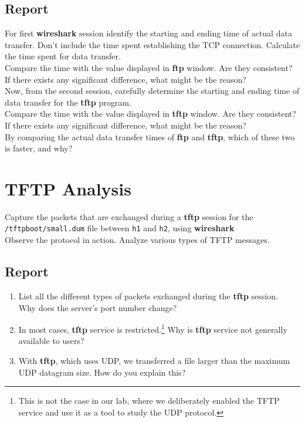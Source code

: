 \documentclass[10pt,a4paper]{article}
\numberwithin{equation}{section}
\numberwithin{figure}{section}
\numberwithin{table}{section}
\begin{document}
\subsection*{Report}
For first \textbf{wireshark} session identify the starting and ending time of actual data transfer.
Don’t include the time spent establishing the TCP connection.
Calculate the time spent for data transfer. \\
Compare the time with the value displayed in \textbf{ftp} window.
Are they consistent?
If there exists any significant difference, what might be the reason? \\
Now, from the second session, carefully determine the starting and ending time of data transfer for the \textbf{tftp} program. \\
Compare the time with the value displayed in \textbf{tftp} window.
Are they consistent?
If there exists any significant difference, what might be the reason? \\
By comparing the actual data transfer times of \textbf{ftp} and \textbf{tftp}, which of these two is faster, and why?

\section{TFTP Analysis}
Capture the packets that are exchanged during a \textbf{tftp} session for the \linebreak \texttt{/tftpboot/small.dum} file between \texttt{h1} and \texttt{h2}, using \textbf{wireshark} \\
Observe the protocol in action.
Analyze various types of TFTP messages.
\subsection*{Report}
\begin{enumerate}
	\item List all the different types of packets exchanged during the \textbf{tftp} session. \\
	Why does the server’s port number change?
	\item In most cases, \textbf{tftp} service is restricted.\footnote{This is not the case in our lab, where we deliberately enabled the TFTP service and use it as a tool to study the UDP protocol.}
	Why is \textbf{tftp} service not generally available to users?
	\item With \textbf{tftp}, which uses UDP, we transferred a file larger than the maximum UDP datagram size.
	How do you explain this?
\end{enumerate}
\end{document}
